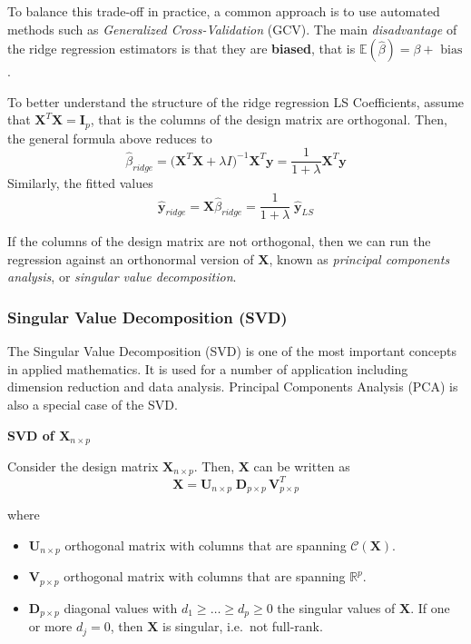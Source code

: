 \documentclass[
]{book}
\begin{document}
To balance this trade-off in practice, a common approach is to use automated methods such as \emph{Generalized Cross-Validation} (GCV). The main \emph{disadvantage} of the ridge regression estimators is that they are \textbf{biased}, that is \(\mathbb{E}(\hat{\beta}) = \beta + \text{ bias}\).

To better understand the structure of the ridge regression LS Coefficients, assume that \(\mathbf{X}^T\mathbf{X} = \mathbf{I}_p\), that is the columns of the design matrix are orthogonal. Then, the general formula above reduces to
\[\hat{\beta}_{ridge} = \bigl(\mathbf{X}^T \mathbf{X} + \lambda I \bigr)^{-1} \mathbf{X}^T \mathbf{y} = \frac{1}{1+\lambda} \mathbf{X}^T \mathbf{y}\]
Similarly, the fitted values
\[\hat{\mathbf{y}}_{ridge} = \mathbf{X} \hat{\beta}_{ridge} = \frac{1}{1+\lambda}\; \hat{\mathbf{y}}_{LS} \]

If the columns of the design matrix are not orthogonal, then we can run the regression against an orthonormal version of \(\mathbf{X}\), known as \emph{principal components analysis}, or \emph{singular value decomposition}.

\subsubsection*{Singular Value Decomposition (SVD)}\label{singular-value-decomposition-svd}

The Singular Value Decomposition (SVD) is one of the most important concepts in applied mathematics. It is used for a number of application including dimension reduction and data analysis. Principal Components Analysis (PCA) is also a special case of the SVD.

\textbf{SVD of \(\mathbf{X}_{n\times p}\)}

Consider the design matrix \(\mathbf{X}_{n\times p}\). Then, \(\mathbf{X}\) can be written as
\[\mathbf{X} = \mathbf{U}_{n\times p} \; \mathbf{D}_{p\times p}\, \mathbf{V}_{p\times p}^T\]

where

\begin{itemize}
\item
  \(\mathbf{U}_{n\times p}\) orthogonal matrix with columns that are spanning \(\mathcal{C}(\mathbf{X})\).
\item
  \(\mathbf{V}_{p\times p}\) orthogonal matrix with columns that are spanning \(\mathbb{R}^p\).
\item
  \(\mathbf{D}_{p\times p}\) diagonal values with \(d_1 \geq \ldots \geq d_p \geq 0\) the singular values of \(\mathbf{X}\). If one or more \(d_j = 0\), then \(\mathbf{X}\) is singular, i.e.~not full-rank.
\end{itemize}
\end{document}
